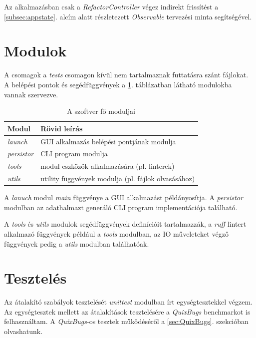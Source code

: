 Az alkalmazásban csak a \emph{RefactorController} végez indirekt frissítést a
\ref{subsec:appstate}. alcím alatt részletezett \emph{Observable} tervezési minta
segítségével. 

\section{Modulok}
\label{sec:modules}

A csomagok a \emph{tests} csomagon kívül nem tartalmaznak futtatásra szánt fájlokat.
A belépési pontok és segédfüggvények a \ref{tab:modules}. táblázatban
látható modulokba vannak szervezve.

\begin{table}[H]
	\centering
	\begin{tabular}{ | m{} | m{} | }
		\hline
		\textbf{Modul} & \textbf{Rövid leírás} \\
		\hline \hline
		\emph{launch} & GUI alkalmazás belépési pontjának modulja \\
		\hline
		\emph{persistor} & CLI program modulja \\
		\hline
		\emph{tools} & modul eszközök alkalmazására (pl. linterek) \\
		\hline
		\emph{utils} & utility függvények modulja (pl. fájlok olvasásához)  \\
		\hline
	\end{tabular}
	\caption{A szoftver fő moduljai}
	\label{tab:modules}
\end{table}

A \emph{lanuch} modul \emph{main} függvénye a GUI alkalmazást példányosítja.
A \emph{persistor} modulban az adathalmazt generáló CLI program implementációja található.

A \emph{tools} és \emph{utils} modulok segédfüggvények definícióit tartalmazzák,
a \emph{ruff} lintert alkalmazó függvények például a \emph{tools} modulban,
az IO műveleteket végző függvények pedig a \emph{utils} modulban találhatóak.

\pagebreak

\section{Tesztelés}

Az átalakító szabályok tesztelését \emph{unittest} modulban írt egységtesztekkel végzem.
Az egységtesztek mellett az átalakítások tesztelésére a \emph{QuixBugs}
benchmarkot \cite{QuixBugs} is felhasználtam.
A \emph{QuixBugs}-os tesztek működéséről a \ref{sec:QuixBugs}. szekcióban olvashatunk.

